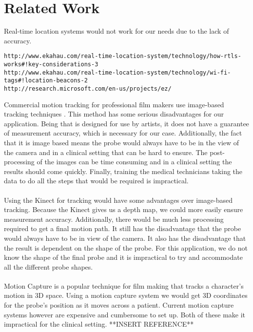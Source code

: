 \documentclass[conference]{acmsiggraph}
\begin{document}
\section{Related Work}

Real-time location systems would not work for our needs due to the lack of accuracy. 
\begin{verbatim}
http://www.ekahau.com/real-time-location-system/technology/how-rtls-works#!key-considerations-3
http://www.ekahau.com/real-time-location-system/technology/wi-fi-tags#!location-beacons-2
http://research.microsoft.com/en-us/projects/ez/
\end{verbatim}

Commercial motion tracking for professional film makers use image-based tracking techniques \cite{trackingwebsite}. This method has some serious disadvantages for our application. Being that is designed for use by artists, it does not have a guarantee of measurement accuracy, which is necessary for our case. Additionally, the fact that it is image based means the probe would always have to be in the view of the camera and in a clinical setting that can be hard to ensure. The post-processing of the images can be time consuming and in a clinical setting the results should come quickly. Finally, training the medical technicians taking the data to do all the steps that would be required is impractical. \\
\\
Using the Kinect for tracking would have some advantages over image-based tracking. Because the Kinect gives us a depth map, we could more easily ensure measurement accuracy. Additionally, there would be much less processing required to get a final motion path. It still has the disadvantage that the probe would always have to be in view of the camera. It also has the disadvantage that the result is dependent on the shape of the probe. For this application, we do not know the shape of the final probe and it is impractical to try and accommodate all the different probe shapes.\\
\\
Motion Capture is a popular technique for film making that tracks a character's motion in 3D space. Using a motion capture system we would get 3D coordinates for the probe's position as it moves across a patient. Current motion capture systems however are expensive and cumbersome to set up. Both of these make it impractical for the clinical setting. **INSERT REFERENCE**\\
\\
\end{document}
